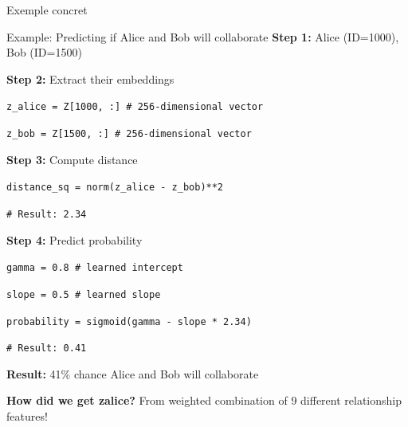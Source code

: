 \documentclass[9pt,aspectratio=169,professionalfonts]{beamer}
\begin{document}
\begin{frame}{Exemple concret}
\begin{exampleblock}{Example: Predicting if Alice and Bob will collaborate}
\textbf{Step 1:} Alice (ID=1000), Bob (ID=1500)

\textbf{Step 2:} Extract their embeddings

\texttt{z\_alice = Z[1000, :] \# 256-dimensional vector}

\texttt{z\_bob = Z[1500, :] \# 256-dimensional vector}

\textbf{Step 3:} Compute distance

\texttt{distance\_sq = norm(z\_alice - z\_bob)**2}

\texttt{\# Result: 2.34}

\textbf{Step 4:} Predict probability

\texttt{gamma = 0.8 \# learned intercept}

\texttt{slope = 0.5 \# learned slope}

\texttt{probability = sigmoid(gamma - slope * 2.34)}

\texttt{\# Result: 0.41}

\textbf{Result:} 41\% chance Alice and Bob will collaborate

\textbf{How did we get z\textunderscore alice?} From weighted combination of 9 different relationship features!
\end{exampleblock}
\end{frame}
\end{document}
